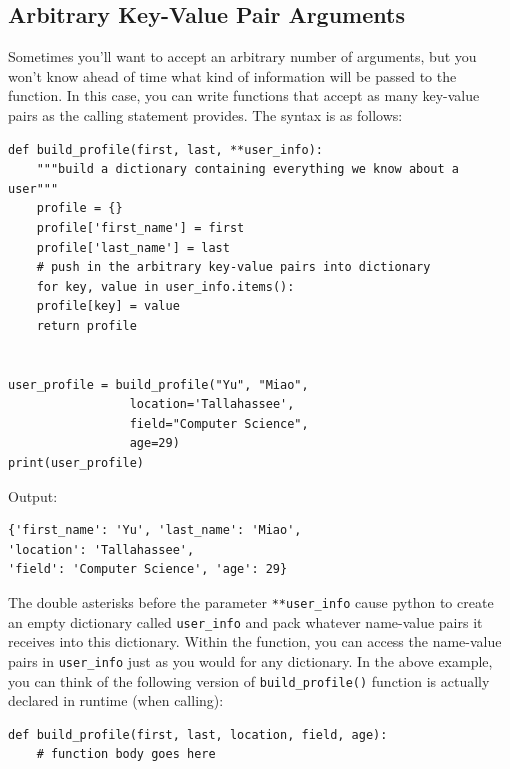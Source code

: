 \documentclass[12pt]{book}
\begin{document}
\subsection{Arbitrary Key-Value Pair Arguments}
\label{sec:orgac9dab1}
Sometimes you’ll want to accept an arbitrary number of arguments, but you won’t know ahead of time what kind of information will be passed to the function. In this case, you can write functions that accept as many key-value pairs as the calling statement provides. The syntax is as follows:
\begin{verbatim}
def build_profile(first, last, **user_info):
    """build a dictionary containing everything we know about a user"""
    profile = {}
    profile['first_name'] = first
    profile['last_name'] = last
    # push in the arbitrary key-value pairs into dictionary
    for key, value in user_info.items():
	profile[key] = value
    return profile


user_profile = build_profile("Yu", "Miao",
			     location='Tallahassee',
			     field="Computer Science",
			     age=29)
print(user_profile)

\end{verbatim}
Output:
\begin{verbatim}
{'first_name': 'Yu', 'last_name': 'Miao',
'location': 'Tallahassee',
'field': 'Computer Science', 'age': 29}
\end{verbatim}
The double asterisks before the parameter \texttt{**user\_info} cause python to create an empty dictionary called \texttt{user\_info} and pack whatever name-value pairs it receives into this dictionary. Within the function, you can access the name-value pairs in \texttt{user\_info} just as you would for any dictionary. In the above example, you can think of the following version of \texttt{build\_profile()} function is actually declared in runtime (when calling):
\begin{verbatim}
def build_profile(first, last, location, field, age):
    # function body goes here
\end{verbatim}
\end{document}
